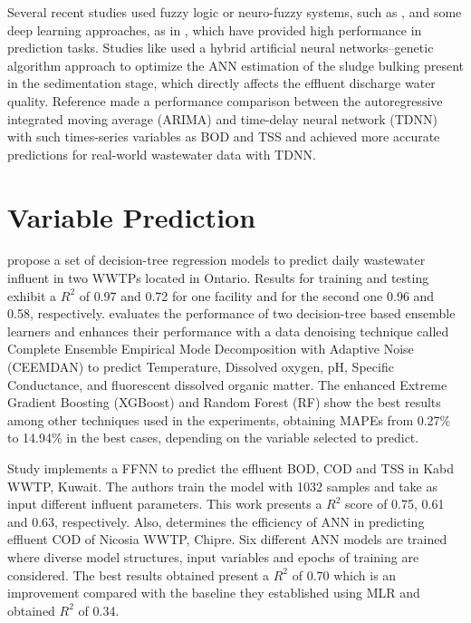 Several recent studies used fuzzy logic or neuro-fuzzy systems, such as \cite{Nourani2018,Nadiri2018,Han2018}, and some deep learning approaches, as in \cite{Guo2015,Alsina2018,Dairi2019}, which have provided high performance in prediction tasks. Studies like \cite{Bagheri2015} used a hybrid artificial neural networks–genetic algorithm approach to optimize the ANN estimation of the sludge bulking present in the sedimentation stage, which directly affects the effluent discharge water quality. Reference \cite{Dellana2009} made a performance comparison between the autoregressive integrated moving average (ARIMA) and time-delay neural network (TDNN) with such times-series variables as BOD and TSS and achieved more accurate predictions for real-world wastewater data with TDNN.

\section{Variable Prediction}
\label{s:RelatedWorks-variablePrediction}

\cite{Zhou2019} propose a set of decision-tree regression models to predict daily wastewater influent in two \ac{WWTP}s located in Ontario. Results for training and testing exhibit a \begin{math}R^2\end{math} of 0.97 and 0.72 for one facility and for the second one 0.96 and 0.58, respectively. \cite{Lu2020} evaluates the performance of two decision-tree based ensemble learners and enhances their performance with a data denoising technique called Complete Ensemble Empirical Mode Decomposition with Adaptive Noise (CEEMDAN) to predict Temperature, Dissolved oxygen, pH, Specific Conductance, and fluorescent dissolved organic matter. The enhanced Extreme Gradient Boosting (XGBoost) and Random Forest (RF) show the best results among other techniques used in the experiments, obtaining MAPEs from 0.27\% to 14.94\% in the best cases, depending on the variable selected to predict.

Study \cite{Alsulaili2021} implements a FFNN to predict the effluent BOD, COD and TSS in Kabd WWTP, Kuwait. The authors train the model with 1032 samples and take as input different influent parameters. This work presents a \begin{math}R^2\end{math} score of 0.75, 0.61 and 0.63, respectively. Also, \cite{Abba2017} determines the efficiency of ANN in predicting effluent COD of Nicosia WWTP, Chipre. Six different ANN models are trained where diverse model structures, input variables and epochs of training are considered. The best results obtained present a \begin{math}R^2\end{math} of 0.70 which is an improvement compared with the baseline they established using MLR and obtained \begin{math}R^2\end{math} of 0.34.

